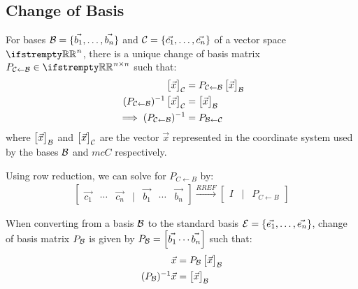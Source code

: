 \documentclass[12pt, a4paper]{article}
\begin{document}
\begin{multicols*}{3}
\subsection{Change of Basis}
For bases $\mathcal{B} = \{\vec{b_1},\ldots,\vec{b_n}\}$ and $\mathcal{C} = \{\vec{c_1},\ldots,\vec{c_n}\}$ of a vector space $\RR^n$, there is a unique change of basis matrix $P_{\mcC{\leftarrow}\mcB} \in \RR^{n{\times}n}$ such that:
\begin{align*}
  \begin{bmatrix}\vec{x}\end{bmatrix}_{\mathcal{C}} &= P_{\mathcal{C}{\leftarrow}\mathcal{B}}\begin{bmatrix}\vec{x}\end{bmatrix}_{\mathcal{B}} \\
  (P_{\mathcal{C}{\leftarrow}\mathcal{B}})^{-1}\begin{bmatrix}\vec{x}\end{bmatrix}_{\mathcal{C}} &= \begin{bmatrix}\vec{x}\end{bmatrix}_{\mathcal{B}} \\ 
  \implies (P_{\mathcal{C}{\leftarrow}\mathcal{B}})^{-1} &= P_{\mathcal{B}{\leftarrow}\mathcal{C}}
\end{align*}
where $\begin{bmatrix}\vec{x}\end{bmatrix}_{\mathcal{B}}$ and $\begin{bmatrix}\vec{x}\end{bmatrix}_{\mathcal{C}}$ are the vector $\vec{x}$ represented in the coordinate system used by the bases $\mathcal{B}$ and $mcC$ respectively.

Using row reduction, we can solve for ${P_{C{\leftarrow}B}}$ by:
\begin{align*}
  \begin{bmatrix}\vec{c_1} & \cdots & \vec{c_n} & | & \vec{b_1} & \cdots & \vec{b_n}\end{bmatrix} \xrightarrow{RREF} \begin{bmatrix}I & | & P_{C{\leftarrow}B}\end{bmatrix} 
\end{align*}

When converting from a basis $\mathcal{B}$ to the standard basis $\mathcal{E} = \{\vec{e_1},\ldots,\vec{e_n}\}$, change of basis matrix $P_{\mathcal{B}}$ is given by $P_{\mathcal{B}} =  \begin{bmatrix}\vec{b_1} \cdots \vec{b_n}\end{bmatrix}$ such that:
\begin{align*}
  \vec{x} &= P_{\mathcal{B}}\begin{bmatrix}\vec{x}\end{bmatrix}_{\mathcal{B}} \\
  (P_{\mathcal{B}})^{-1}\vec{x} &= \begin{bmatrix}\vec{x}\end{bmatrix}_{\mathcal{B}}
\end{align*}
\colbreak


\end{multicols*}
\end{document}

